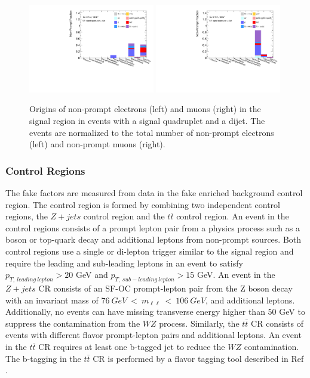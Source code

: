\begin{figure}[!htbp]
    \centering
    \includegraphics[width = 0.49\textwidth]{figures/Analysis/Background/NonPromptElectronSRVBSComposition.pdf}
    \includegraphics[width = 0.49\textwidth]{figures/Analysis/Background/NonPromptMuonSRVBSComposition.pdf}
    \caption{ Origins of non-prompt electrons (left) and muons (right) in the signal region in events with a signal quadruplet and a dijet. The events are normalized to the total number of non-prompt electrons (left) and non-prompt muons (right). \label{fig:NonPromptLepSRDijet}}
\end{figure}

\subsubsection{Control Regions}
\label{subsubsec:CR}
The fake factors are measured from data in the fake enriched background control region. The control region is formed by combining two independent control regions, the $Z+jets$ control region and the $t\bar{t}$ control region. An event in the control regions consists of a prompt lepton pair from a physics process such as a boson or top-quark decay and additional leptons from non-prompt sources. Both control regions use a single or di-lepton trigger similar to the signal region and require the leading and sub-leading leptons in an event to satisfy $p_{T,~leading~lepton} > 20$ GeV and $p_{T,~sub-leading~lepton} > 15$ GeV. An event in the $Z+jets$ CR consists of an SF-OC prompt-lepton pair from the Z boson decay with an invariant mass of $ 76~GeV~<~m_{\ell \ell}~<~106~GeV$, and additional leptons. Additionally, no events can have missing transverse energy higher than $50$ GeV to suppress the contamination from the $WZ$ process. Similarly, the $t\bar{t}$ CR consists of events with different flavor prompt-lepton pairs and additional leptons. An event in the $t\bar{t}$ CR requires at least one b-tagged jet to reduce the $WZ$ contamination. The b-tagging in the $t\bar{t}$ CR is performed by a flavor tagging tool described in Ref \cite{btagATLAS}.


